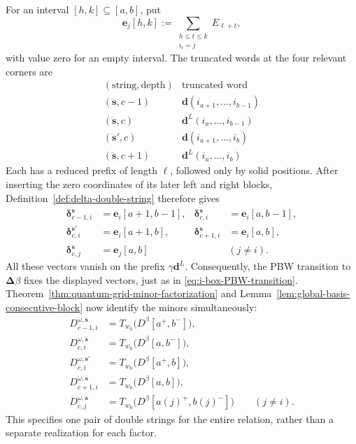 \documentclass[12pt, reqno]{amsart}
\theoremstyle{plain}
\theoremstyle{definition}
\numberwithin{equation}{section}
\begin{document}
For an interval \([h,k]\subseteq[a,b]\), put
\[
 \mathbf e_j[h,k]
   :=\sum_{\substack{h\leq t\leq k\\ i_t=j}}E_{\ell+t},
\]
with value zero for an empty interval. The truncated words at the
four relevant corners are
\[
\begin{array}{c|c}
 (\text{string},\text{depth})&\text{truncated word}\\ \hline
 (\ddot{\mathbf s},c-1)&\mathbf d(i_{a+1},\ldots,i_{b-1})\\
 (\ddot{\mathbf s},c)&\mathbf d^L(i_a,\ldots,i_{b-1})\\
 (\ddot{\mathbf s}',c)&\mathbf d(i_{a+1},\ldots,i_b)\\
 (\ddot{\mathbf s},c+1)&\mathbf d^L(i_a,\ldots,i_b)
\end{array}
\]
Each has a reduced prefix of length \(\ell\), followed only by
solid positions. After inserting the zero coordinates of its later
left and right blocks, Definition~\ref{def:delta-double-string}
therefore gives
\[
\begin{aligned}
 \boldsymbol\delta_{c-1,i}^{\ddot{\mathbf s}}
   &=\mathbf e_i[a+1,b-1],&
 \boldsymbol\delta_{c,i}^{\ddot{\mathbf s}}
   &=\mathbf e_i[a,b-1],\\
 \boldsymbol\delta_{c,i}^{\ddot{\mathbf s}'}
   &=\mathbf e_i[a+1,b],&
 \boldsymbol\delta_{c+1,i}^{\ddot{\mathbf s}}
   &=\mathbf e_i[a,b],\\
 \boldsymbol\delta_{c,j}^{\ddot{\mathbf s}}
   &=\mathbf e_j[a,b]
   &&(j\neq i).
\end{aligned}
\]
All these vectors vanish on the prefix \(\gamma\mathbf d^L\).
Consequently, the PBW transition to
\(\boldsymbol\Delta\beta\) fixes the displayed vectors, just
as in \eqref{eq:i-box-PBW-transition}.
Theorem~\ref{thm:quantum-grid-minor-factorization} and
Lemma~\ref{lem:global-basis-consecutive-block} now identify the
minors simultaneously:
\[
\begin{aligned}
 D_{c-1,i}^{\omega,\ddot{\mathbf s}}
   &=T_{w_0}\bigl(D^\beta[a^+,b^-]\bigr),\\
 D_{c,i}^{\omega,\ddot{\mathbf s}}
   &=T_{w_0}\bigl(D^\beta[a,b^-]\bigr),\\
 D_{c,i}^{\omega,\ddot{\mathbf s}'}
   &=T_{w_0}\bigl(D^\beta[a^+,b]\bigr),\\
 D_{c+1,i}^{\omega,\ddot{\mathbf s}}
   &=T_{w_0}\bigl(D^\beta[a,b]\bigr),\\
 D_{c,j}^{\omega,\ddot{\mathbf s}}
   &=T_{w_0}\bigl(D^\beta[a(j)^+,b(j)^-]\bigr)
     \qquad(j\neq i).
\end{aligned}
\]
This specifies one pair of double strings for the entire relation,
rather than a separate realization for each factor.
\end{document}
